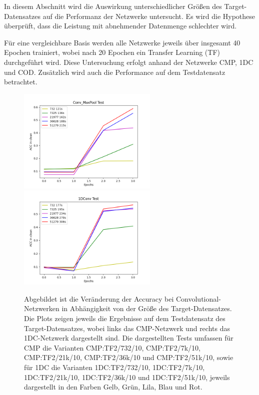 In diesem Abschnitt wird die Auswirkung unterschiedlicher Größen des Target-Datensatzes auf die Performanz der Netzwerke untersucht. Es wird 
die Hypothese überprüft, dass die Leistung mit abnehmender Datenmenge schlechter wird.

Für eine vergleichbare Basis werden alle Netzwerke jeweils über insgesamt 40 Epochen trainiert, wobei nach 20 Epochen ein Transfer Learning (TF) 
durchgeführt wird. Diese Untersuchung erfolgt anhand der Netzwerke CMP, 1DC und COD. Zusätzlich wird auch die Performance auf dem Testdatensatz 
betrachtet.

\begin{figure}[htpb]
    \includegraphics[height=5cm]{../../Plots/ba_plots/targetgroesse/cmp_ts.png}
    \includegraphics[height=5cm]{../../Plots/ba_plots/targetgroesse/1dc_ts.png}
    \caption{\label{fig:targetgroessedeepdir} 
    \small{Abgebildet ist die Veränderung der Accuracy bei Convolutional-Netzwerken in Abhängigkeit von der Größe des Target-Datensatzes. Die 
    Plots zeigen jeweils die Ergebnisse auf dem Testdatensatz des Target-Datensatzes, wobei links das CMP-Netzwerk und rechts das 1DC-Netzwerk 
    dargestellt sind.
    Die dargestellten Tests umfassen für CMP die Varianten CMP:TF2/732/10, CMP:TF2/7k/10, CMP:TF2/21k/10, CMP:TF2/36k/10 und CMP:TF2/51k/10, 
    sowie für 1DC die Varianten 1DC:TF2/732/10, 1DC:TF2/7k/10, 1DC:TF2/21k/10, 1DC:TF2/36k/10 und 1DC:TF2/51k/10, jeweils dargestellt in den 
    Farben Gelb, Grün, Lila, Blau und Rot.
    }}
\end{figure}

